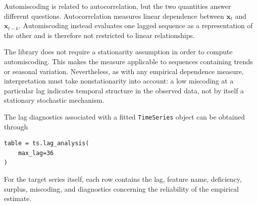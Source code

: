 Automiscoding is related to autocorrelation, but the two quantities answer
different questions. Autocorrelation measures linear dependence between
\(\mathbf{x}_t\) and \(\mathbf{x}_{t-k}\). Automiscoding instead evaluates one
lagged sequence as a representation of the other and is therefore not restricted
to linear relationships.

The library does not require a stationarity assumption in order to compute
automiscoding. This makes the measure applicable to sequences containing
trends or seasonal variation. Nevertheless, as with any empirical dependence
measure, interpretation must take nonstationarity into account: a low miscoding
at a particular lag indicates temporal structure in the observed data, not by
itself a stationary stochastic mechanism.

The lag diagnostics associated with a fitted \texttt{TimeSeries} object can be
obtained through

\begin{sourcecode}
{\scriptsize
\begin{verbatim}
table = ts.lag_analysis(
    max_lag=36
)
\end{verbatim}}
\end{sourcecode}

For the target series itself, each row contains the lag, feature name,
deficiency, surplus, miscoding, and diagnostics concerning the reliability of
the empirical estimate.

